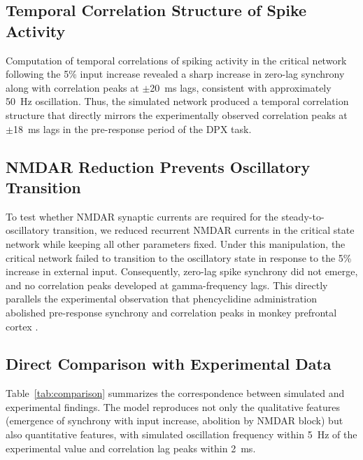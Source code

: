 \documentclass[10pt]{article}
\begin{document}
\subsection{Temporal Correlation Structure of Spike Activity}

Computation of temporal correlations of spiking activity in the critical
network following the 5\% input increase revealed a sharp increase in
zero-lag synchrony along with correlation peaks at $\pm$20~ms lags, consistent
with approximately 50~Hz oscillation. Thus, the simulated network produced a
temporal correlation structure that directly mirrors the experimentally
observed correlation peaks at $\pm$18~ms lags in the pre-response period of
the DPX task.

\subsection{NMDAR Reduction Prevents Oscillatory Transition}

To test whether NMDAR synaptic currents are required for the steady-to-
oscillatory transition, we reduced recurrent NMDAR currents in the critical
state network while keeping all other parameters fixed. Under this
manipulation, the critical network failed to transition to the oscillatory
state in response to the 5\% increase in external input. Consequently,
zero-lag spike synchrony did not emerge, and no correlation peaks developed
at gamma-frequency lags. This directly parallels the experimental observation
that phencyclidine administration abolished pre-response synchrony and
correlation peaks in monkey prefrontal cortex \citep{zick2018blocking}.

\subsection{Direct Comparison with Experimental Data}

Table~\ref{tab:comparison} summarizes the correspondence between simulated
and experimental findings. The model reproduces not only the qualitative
features (emergence of synchrony with input increase, abolition by NMDAR
block) but also quantitative features, with simulated oscillation frequency
within 5~Hz of the experimental value and correlation lag peaks within 2~ms.
\end{document}
